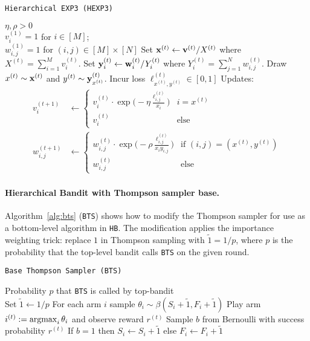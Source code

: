 \begin{algorithm}[tb]
   \caption{\texttt{Hierarchical EXP3 (HEXP3)}}
   \label{alg:meta-exp2}
   \begin{algorithmic}   
    $\eta,\rho>0$\\
   	 $v^{(1)}_{i}=1$ for $i\in[M]$;\\ 
   	 $w^{(1)}_{i,j}=1$ for $(i,j)\in[M]\times[N]$
	\STATE Set ${\mathbf x}^{(t)} \leftarrow {\mathbf v}^{(t)}/X^{(t)}$ where $X^{(t)} = \sum_{i=1}^M v^{(t)}_{i}$.
	\STATE Set ${\mathbf y}^{(t)}_{i} \leftarrow {\mathbf w}^{(t)}_{i}/Y^{(t)}_{i}$ where $Y^{(t)}_{i} = \sum_{j=1}^N w^{(t)}_{i,j}$.
	\STATE Draw $x^{(t)}\sim {\mathbf x}^{(t)}$ and $y^{(t)}\sim {\mathbf y}^{(t)}_{x^{(t)}}$.
	\STATE Incur loss $\ell^{(t)}_{x^{(t)},y^{(t)}}\in [0,1]$ 
	\STATE Updates:
	\begin{align}
		v^{(t+1)}_i & \leftarrow \begin{cases}
			v^{(t)}_{i}\cdot 
			\exp\big(-\eta\frac{\ell^{(t)}_{i,j}}{x_i}\big) & i=x^{(t)} \\
			v^{(t)}_{i} & \text{else}
		\end{cases}		 
		\\
		w^{(t+1)}_{i,j} & \leftarrow \begin{cases}
			w^{(t)}_{i,j}\cdot \exp\big(-\rho\frac{\ell^{(t)}_{i,j}}{x_iy_{i,j}}\big) 
			& \text{if }(i,j)=(x^{(t)}, y^{(t)}) \\
			w^{(t)}_{i,j} &\text{else}
		\end{cases}
	\end{align}
   	\ENDFOR
   	\end{algorithmic}
\end{algorithm}

\paragraph{Hierarchical Bandit with Thompson sampler base.}
Algorithm~\ref{alg:bts} (\texttt{BTS}) shows how to modify the Thompson sampler for use as a bottom-level algorithm in \texttt{HB}. The modification applies the importance weighting trick: replace $1$ in Thompson sampling with $\tilde{1}=1/p$, where $p$ is the probability that the top-level bandit calls \texttt{BTS} on the given round. 


\begin{algorithm}[tb]
   \caption{\texttt{Base Thompson Sampler (BTS)}}
   \label{alg:bts}
   \begin{algorithmic}
   	 Probability $p$ that \texttt{BTS} is called by top-bandit\\
   	\STATE Set $\tilde{1}\leftarrow 1/p$
   	 \STATE For each arm $i$ sample $\theta_i\sim\beta(S_i +\tilde{1},F_i +\tilde{1})$
	\STATE Play arm $i^{(t)} := \operatorname*{argmax}_i \theta_i$ and observe reward $r^{(t)}$
	\STATE Sample $b$ from Bernoulli with success probability $r^{(t)}$
	\STATE If $b=1$ then $S_i \leftarrow S_i + \tilde{1}$ else $F_i\leftarrow F_i+\tilde{1}$
   	\end{algorithmic}
\end{algorithm}


